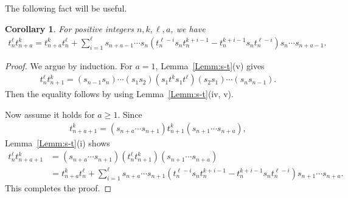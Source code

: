 \documentclass[a4paper, oneside]{amsart}
\numberwithin{equation}{section}
\newtheorem{corollary}[equation]{Corollary}
\theoremstyle{definition}
\theoremstyle{remark}
\begin{document}
The following fact will be useful.
\begin{corollary}\label{Cor:t-n-n+1}For positive integers $n,k,\ell,a$, we have
\begin{align*}
t_{n}^{\ell}t_{n+a}^k=t_{n+a}^kt_{n}^{\ell}+\sum_{i=1}^{\ell}
s_{n+a-1}\cdots s_{n}
\left(t_n^{\ell-i}s_nt_n^{k+i-1}-t_n^{k+i-1}s_nt_n^{\ell-i}\right)
s_{n}\cdots s_{n+a-1}.
\end{align*}
\end{corollary}
\begin{proof}We argue by induction. For $a=1$, Lemma~\ref{Lemm:s-t}(v) gives
  \begin{align*}
 t_n^{\ell}t_{n+1}^k=(s_{n-1}s_n)\cdots(s_1s_2)(s_1t^ks_1t^{\ell})(s_2s_1)\cdots(s_ns_{n-1}).
  \end{align*}
Then the equality follows by using Lemma~\ref{Lemm:s-t}(iv, v).

Now assume it holds for $a\geq 1$.  Since
 \begin{align*}
  t_{n+a+1}^k=(s_{n+a}\cdots s_{n+1})t_{n+1}^k(s_{n+1}\cdots s_{n+a}),
 \end{align*}
  Lemma~\ref{Lemm:s-t}(i) shows
\begin{align*}
t_{n}^{\ell}t_{n+a+1}^k
&= (s_{n+a}\cdots s_{n+1})(t_{n}^{\ell}t_{n+1}^{k})(s_{n+1}\cdots s_{n+a}) \\
&= t_{n+a}^k t_{n}^{\ell} + \sum_{i=1}^{\ell} s_{n+a}\cdots s_{n+1}(t_n^{\ell-i}s_n t_n^{k+i-1} - t_n^{k+i-1}s_n t_n^{\ell-i})s_{n+1}\cdots s_{n+a}.
\end{align*}
This completes the proof.
\end{proof}
\end{document}
